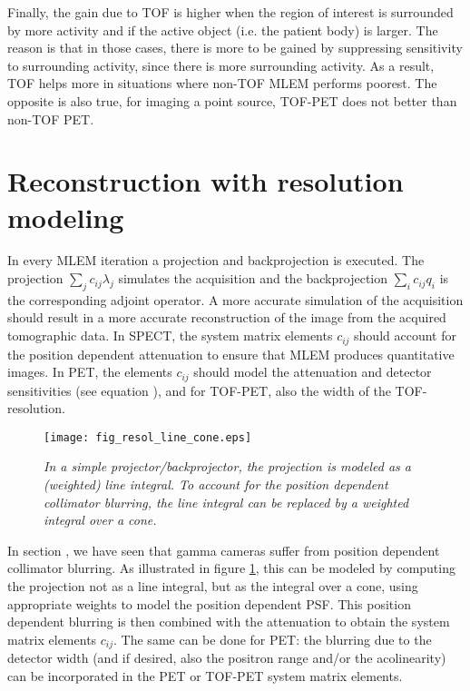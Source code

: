 Finally, the gain due to TOF is higher when the region of interest is
surrounded by more activity and if the active object (i.e. the patient
body) is larger. The reason is that in those cases, there is more to
be gained by suppressing sensitivity to surrounding activity, since
there is more surrounding activity. As a result, TOF helps more in
situations where non-TOF MLEM performs poorest. The opposite is also
true, for imaging a point source, TOF-PET does not better than non-TOF
PET.

\section{Reconstruction with resolution modeling \label{sec:resol}}
In every MLEM iteration a projection and backprojection is
executed. The projection $\sum_j c_{ij} \lambda_j$ simulates the
acquisition and the backprojection $\sum_i c_{ij} q_i$ is the
corresponding adjoint operator. A more accurate simulation of the
acquisition should result in a more accurate reconstruction of the
image from the acquired tomographic data. In SPECT, the system matrix
elements $c_{ij}$ should account for the position dependent
attenuation to ensure that MLEM produces quantitative images. In PET,
the elements $c_{ij}$ should model the attenuation and detector
sensitivities (see equation ), and for TOF-PET, also
the width of the TOF-resolution.

\begin{figure}[htb]
\centering
\texttt{[image: fig\_resol\_line\_cone.eps]}
\caption{\label{fig:resolcone} \emph{In a simple projector/backprojector,
    the projection is modeled as a (weighted) line integral. To
    account for the position dependent collimator blurring, the line
    integral can be replaced by a weighted integral over a cone.}}
\end{figure}
In section , we have seen that gamma cameras
suffer from position dependent collimator blurring. As illustrated in
figure \ref{fig:resolcone}, this can be modeled by computing the
projection not as a line integral, but as the integral over a cone,
using appropriate weights to model the position dependent PSF. This
position dependent blurring is then combined with the attenuation to
obtain the system matrix elements $c_{ij}$. The same can be done for
PET: the blurring due to the detector width (and if desired, also the
positron range and/or the acolinearity) can be incorporated in the PET
or TOF-PET system matrix elements.

